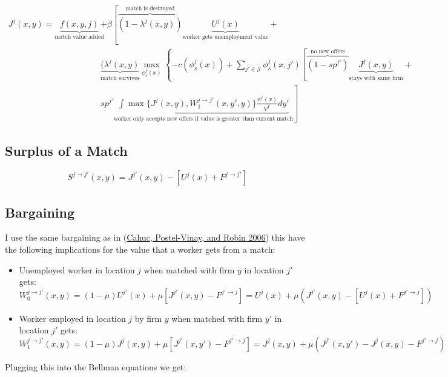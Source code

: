 \documentclass[
  letterpaper,
  DIV=11,
  numbers=noendperiod]{scrartcl}
\providecommand{\tightlist}{%
  \setlength{\itemsep}{0pt}\setlength{\parskip}{0pt}}\usepackage{longtable,booktabs,array}
\begin{document}
\begin{align*}
J^j(x,y) = \underbrace{f(x,y,j)}_{\text{match value added}} &+ \beta\left[  \overbrace{ (1-\lambda^j(x,y)) }^{\text{match is destroyed}}\underbrace{U^{j}(x)}_{\text{worker gets unemployment value}} \right. + \\
  & \underbrace{(\lambda^j(x,y)}_{\text{match survives}} \max_{\phi_s^j(x)}\left\{-c(\phi_s^j(x)) +  \sum_{j'\in\mathcal{J}}\phi^j_s(x,j')\left[ \overbrace{(1-sp^{j'})}^{\text{no new offers}} \underbrace{J^j(x,y)}_{\text{stays with same firm}} \right. \right. +\\
& sp^{j'} \left. \underbrace{\int\max\{J^{j}(x,y),W^{j\to j'}_{1}(x,y',y)\}\frac{v^{j'}(x)}{V^{j'}}dy'}_{\text{worker only accepts new offers if value is greater than current match}}  \right]
\end{align*}

\hypertarget{surplus-of-a-match}{%
\subsection{Surplus of a Match}\label{surplus-of-a-match}}

\[S^{j\to j'}(x,y) = J^{j'}(x,y) - \left[U^j(x) + F^{j\to j'}\right]\]

\hypertarget{bargaining}{%
\subsection{Bargaining}\label{bargaining}}

I use the same bargaining as in
(\protect\hyperlink{ref-cahucWageBargainingOntheJob2006}{Cahuc,
Postel-Vinay, and Robin 2006}) this have the following implications for
the value that a worker gets from a match:

\begin{itemize}
\tightlist
\item
  Unemployed worker in location \(j\) when matched with firm \(y\) in
  location \(j'\) gets:
  \[W^{j \to j'}_{0}(x,y) = (1 - \mu) U^{j'}(x) + \mu [J^{j'}(x,y) - F^{j' \to j}] = U^{j}(x) + \mu \left(J^{j'}(x,y) - [U^{j}(x) + F^{j' \to j}]\right)\]
\item
  Worker employed in location \(j\) by firm \(y\) when matched with firm
  \(y'\) in location \(j'\) gets:
  \[W^{j \to j'}_{1}(x,y) = (1 - \mu) J^{j}(x,y) + \mu [J^{j'}(x,y') - F^{j' \to j}] = J^{j}(x,y) + \mu \left(J^{j'}(x,y') - J^{j}(x,y) - F^{j' \to j}\right)\]
\end{itemize}

Plugging this into the Bellman equations we get:
\end{document}

